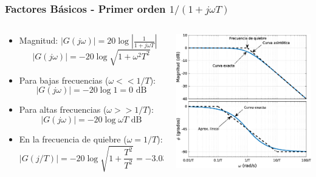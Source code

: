 \documentclass[aspectratio=169, handout]{beamer}
\theoremstyle{definition}
\theoremstyle{plain}
\theoremstyle{remark}
\begin{document}
\begin{frame}[<+->]\frametitle{Factores Básicos - Primer orden $1/(1+j \omega T)$}
\begin{columns}
	\begin{column}{0.5\textwidth}
	\small
	\begin{itemize}
		\item Magnitud: $\left| G(j\omega) \right| = 20 \log \left| \frac{1}{1+j\omega T} \right|$
		\begin{equation*}
			\left| G(j\omega) \right| = -20 \log \sqrt{1+\omega^2 T^2}
		\end{equation*}
		\item Para bajas frecuencias ($\omega << 1/T$):
		\begin{equation*}
			\left| G(j\omega) \right| = -20 \log 1 = 0 \text{ dB}
		\end{equation*}
		\item Para altas frecuencias ($\omega >> 1/T$):
		\begin{equation*}
			\left| G(j\omega) \right| = -20 \log \omega T \text{ dB}
		\end{equation*}
		\item En la frecuencia de quiebre ($\omega = 1/T$):
		\begin{equation*}
			\left| G(j/T) \right| = - 20\log \sqrt{1 + \frac{T^2}{T^2}} = -3.03 \text{ dB}
		\end{equation*}
	\end{itemize}
	\end{column}
	\begin{column}{0.5\textwidth}
	\centering
	\includegraphics[width=6.5cm]{images/bodeFirstOrderIntegral.eps}
	\end{column}
\end{columns}
\end{frame}
\end{document}
